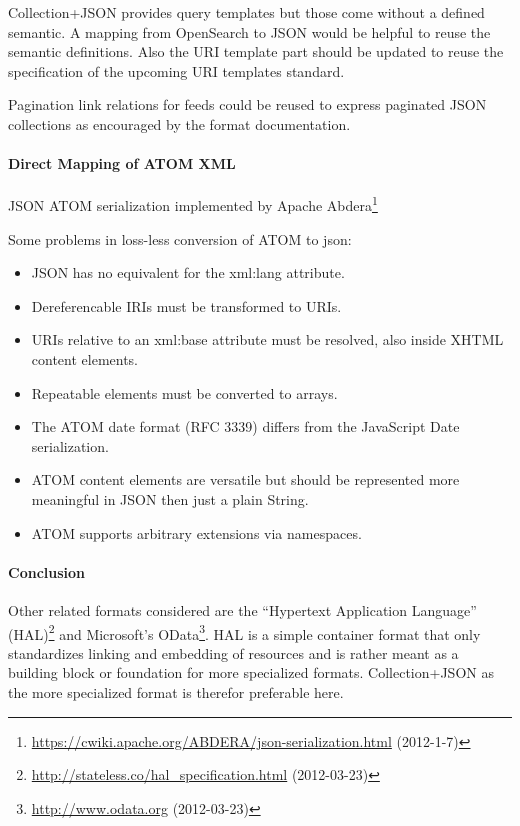 \documentclass[12pt,a4paper,twoside]{scrartcl}		%
\newcommand{\citeurl}[2]{\url{#1} (#2)}
\begin{document}
Collection+JSON provides query templates but those come without a defined
semantic. A mapping from OpenSearch to JSON would be helpful to reuse the
semantic definitions. Also the URI template part should be updated to reuse the
specification of the upcoming URI templates standard\cite{Gregorio2012}.

Pagination link relations for feeds\cite{RFC5005} could be reused to express
paginated JSON collections as encouraged by the format
documentation\cite[sec. 5.5]{Amundsen2011a}.



\paragraph{Direct Mapping of ATOM XML}
JSON ATOM serialization implemented by Apache
Abdera\footnote{\cite{Snell2008}
  \citeurl{https://cwiki.apache.org/ABDERA/json-serialization.html}{2012-1-7}}

Some problems in loss-less conversion of ATOM to json:\cite{Snell2008}
\begin{itemize}
  \item JSON has no equivalent for the xml:lang attribute.
  \item Dereferencable IRIs must be transformed to URIs.
  \item URIs relative to an xml:base attribute must be resolved, also inside XHTML content elements.
  \item Repeatable elements must be converted to arrays.
  \item The ATOM date format (RFC 3339) differs from the JavaScript Date serialization.
  \item ATOM content elements are versatile but should be represented more meaningful in JSON then just a plain String.
  \item ATOM supports arbitrary extensions via namespaces.
\end{itemize}

\paragraph{Conclusion}

Other related formats considered are the ``Hypertext Application Language''
(HAL)\footnote{\citeurl{http://stateless.co/hal_specification.html}{2012-03-23}}
and Microsoft's OData\footnote{\citeurl{http://www.odata.org}{2012-03-23}}. HAL
is a simple container format that only standardizes linking and embedding of
resources and is rather meant as a building block or foundation for more
specialized formats. Collection+JSON as the more specialized format is therefor
preferable here.
\end{document}
